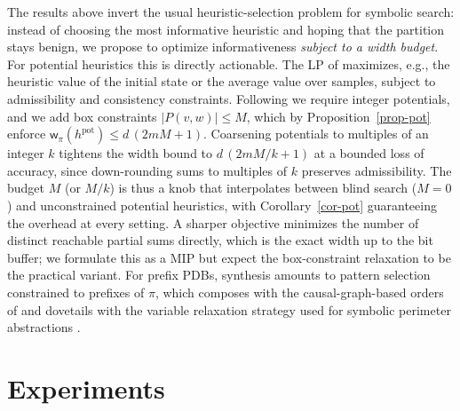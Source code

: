 \documentclass[letterpaper]{article}
\newcommand{\hpot}{\ensuremath{h^{\text{pot}}}}
\newcommand{\width}{\ensuremath{\mathsf{w}}}
\theoremstyle{plain}
\theoremstyle{definition}
\theoremstyle{remark}
\begin{document}
The results above invert the usual heuristic-selection problem for
symbolic search: instead of choosing the most informative heuristic and
hoping that the partition stays benign, we propose to optimize
informativeness \emph{subject to a width budget}. For potential
heuristics this is directly actionable. The LP of
\citet{pommerening-et-al-aaai2015} maximizes, e.g., the heuristic value
of the initial state or the average value over samples, subject to
admissibility and consistency constraints. Following
\citet{fiser-et-al-aaai2022} we require integer potentials, and we add
box constraints $|P(v,w)| \leq M$, which by
Proposition~\ref{prop-pot} enforce
$\width_\pi(\hpot) \leq d\,(2mM+1)$. Coarsening potentials to multiples
of an integer $k$ tightens the width bound to $d\,(2mM/k + 1)$ at a
bounded loss of accuracy, since down-rounding sums to multiples of $k$
preserves admissibility. The budget $M$ (or $M/k$) is thus a knob that
interpolates between blind search ($M = 0$) and unconstrained potential
heuristics, with Corollary~\ref{cor-pot} guaranteeing the overhead at
every setting. A sharper objective minimizes the number of distinct
reachable partial sums directly, which is the exact width up to the bit
buffer; we formulate this as a MIP but expect the box-constraint
relaxation to be the practical variant. For prefix PDBs, synthesis
amounts to pattern selection constrained to prefixes of $\pi$, which
composes with the causal-graph-based orders of
\citet{kissmann-edelkamp-aaai2011} and dovetails with the variable
relaxation strategy used for symbolic perimeter abstractions
\citep{torralba-et-al-aij2018}.

\section{Experiments}
\label{sec-experiments}
\end{document}
